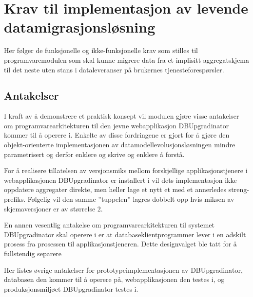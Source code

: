 \section{Krav til implementasjon av levende datamigrasjonsløsning}

Her følger de funksjonelle og ikke-funksjonelle krav som stilles til programvaremodulen som skal kunne migrere data fra et implisitt aggregatskjema til det neste uten stans i dataleveranser på brukernes tjenesteforespørsler.

\subsection{Antakelser}

I kraft av å demonstrere et praktisk konsept vil modulen gjøre visse antakelser om programvarearkitekturen til den jevne webapplikasjon DBUpgradinator kommer til å operere i. Enkelte av disse fordringene er gjort for å gjøre den objekt-orienterte implementasjonen av datamodellevolusjonsløsningen mindre parametrisert og derfor enklere og skrive og enklere å forstå.

For å realisere tillatelsen av versjonsmiks mellom forskjellige applikasjonstjenere i webapplikasjonen DBUpgradinator er installert i vil dets implementasjon ikke oppdatere aggregater direkte, men heller lage et nytt et med et annerledes streng-prefiks. Følgelig vil den samme ''tuppelen'' lagres dobbelt opp hvis miksen av skjemaversjoner er av størrelse 2.

En annen vesentlig antakelse om programvarearkitekturen til systemet DBUpgradinator skal operere i er at databaseklientprogrammer lever i en adskilt prosess fra prosessen til applikasjonstjeneren. Dette designvalget ble tatt for å fullstendig separere 

Her listes øvrige antakelser for prototypeimplementasjonen av DBUpgradinator, databasen den kommer til å operere på, webapplikasjonen den testes i, og produksjonsmiljøet DBUpgradinator testes i.

